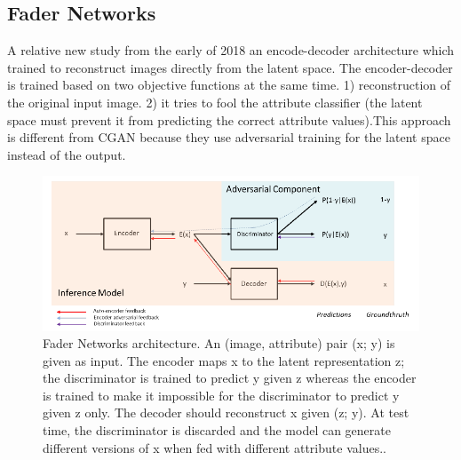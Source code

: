 \documentclass[letterpaper,12pt]{article}
\begin{document}
\subsection{Fader Networks} A relative new study from the early of 2018 \cite{DBLP:journals/corr/LampleZUBDR17} an encode-decoder architecture which trained to reconstruct images directly from the latent space. The encoder-decoder is trained based on two objective functions at the same time. 1) reconstruction of the original input image. 2) it tries to fool the attribute classifier (the latent space must prevent it from predicting the correct attribute values).This approach is different from CGAN because they use adversarial training for the latent space instead of the output.
\begin{figure}[H]
\centering
\includegraphics[width=150mm]{fader_net}
\caption{\label{figure 4  }Fader Networks architecture. An (image, attribute) pair (x; y) is given as input. The encoder maps x to the latent representation z; the discriminator is trained to predict y given z whereas the encoder is trained to make it impossible for the discriminator to predict y given z only. The decoder should
reconstruct x given (z; y). At test time, the discriminator is discarded and the model can generate
different versions of x when fed with different attribute values..}
\end{figure}
\end{document}
